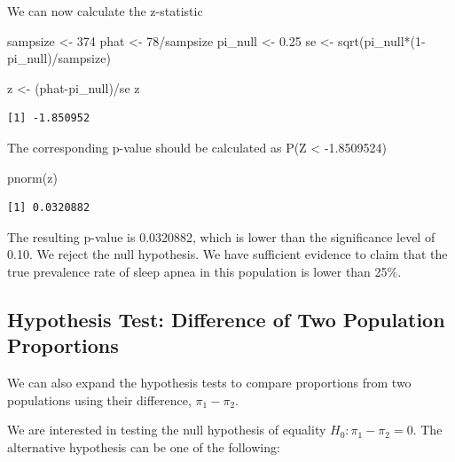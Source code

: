 \documentclass[
  letterpaper,
  DIV=11,
  numbers=noendperiod]{scrartcl}
\newenvironment{Shaded}{\begin{snugshade}}{\end{snugshade}}
\newcommand{\DecValTok}[1]{\textcolor[rgb]{0.68,0.00,0.00}{#1}}
\newcommand{\FloatTok}[1]{\textcolor[rgb]{0.68,0.00,0.00}{#1}}
\newcommand{\FunctionTok}[1]{\textcolor[rgb]{0.28,0.35,0.67}{#1}}
\newcommand{\NormalTok}[1]{\textcolor[rgb]{0.00,0.23,0.31}{#1}}
\newcommand{\OtherTok}[1]{\textcolor[rgb]{0.00,0.23,0.31}{#1}}
\newcommand{\SpecialCharTok}[1]{\textcolor[rgb]{0.37,0.37,0.37}{#1}}
\begin{document}
We can now calculate the z-statistic

\begin{Shaded}
\begin{Highlighting}[]
\NormalTok{sampsize }\OtherTok{\textless{}{-}} \DecValTok{374}
\NormalTok{phat }\OtherTok{\textless{}{-}} \DecValTok{78}\SpecialCharTok{/}\NormalTok{sampsize}
\NormalTok{pi\_null }\OtherTok{\textless{}{-}} \FloatTok{0.25}
\NormalTok{se }\OtherTok{\textless{}{-}} \FunctionTok{sqrt}\NormalTok{(pi\_null}\SpecialCharTok{*}\NormalTok{(}\DecValTok{1}\SpecialCharTok{{-}}\NormalTok{pi\_null)}\SpecialCharTok{/}\NormalTok{sampsize)}

\NormalTok{z }\OtherTok{\textless{}{-}}\NormalTok{ (phat}\SpecialCharTok{{-}}\NormalTok{pi\_null)}\SpecialCharTok{/}\NormalTok{se}
\NormalTok{z}
\end{Highlighting}
\end{Shaded}

\begin{verbatim}
[1] -1.850952
\end{verbatim}

The corresponding p-value should be calculated as P(Z \textless{}
-1.8509524)

\begin{Shaded}
\begin{Highlighting}[]
\FunctionTok{pnorm}\NormalTok{(z)}
\end{Highlighting}
\end{Shaded}

\begin{verbatim}
[1] 0.0320882
\end{verbatim}

The resulting p-value is 0.0320882, which is lower than the significance
level of 0.10. We reject the null hypothesis. We have sufficient
evidence to claim that the true prevalence rate of sleep apnea in this
population is lower than 25\%.

\subsection{Hypothesis Test: Difference of Two Population
Proportions}\label{hypothesis-test-difference-of-two-population-proportions}

We can also expand the hypothesis tests to compare proportions from two
populations using their difference, \(\pi_1 - \pi_2\).

We are interested in testing the null hypothesis of equality
\(H_0: \pi_1 - \pi_2=0\). The alternative hypothesis can be one of the
following:
\end{document}
